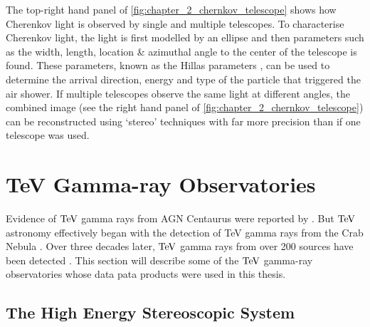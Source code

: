 The top-right hand panel of \autoref{fig:chapter_2_chernkov_telescope} shows how Cherenkov light is observed by single and multiple telescopes. To characterise Cherenkov light, the light is first modelled by an ellipse and then parameters such as the width, length, location \& azimuthal angle to the center of the telescope is found. These parameters, known as the Hillas parameters \citep{1985ICRC....3..445H}, can be used to determine the arrival direction, energy and type of the particle that triggered the air shower. If multiple telescopes observe the same light at different angles, the combined image (see the right hand panel of \autoref{fig:chapter_2_chernkov_telescope}) can be reconstructed using `stereo' techniques with far more precision than if one telescope was used.

\section{TeV Gamma-ray Observatories} \label{sec:02_TeV_observatories}

Evidence of $\TeV$ gamma rays from AGN Centaurus were reported by \cite{1975ApJ...197L...9G}. But $\TeV$ astronomy effectively began with the detection of TeV gamma rays from the Crab Nebula \citep{1989ApJ...342..379W}. Over three decades later, $\TeV$ gamma rays from over 200 sources have been detected \citep{2008ICRC....3.1341W}. This section will describe some of the $\TeV$ gamma-ray observatories whose data pata products were used in this thesis.

\subsection{The High Energy Stereoscopic System} \label{sec:02_HESS}

